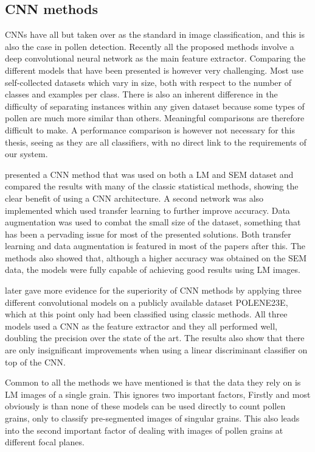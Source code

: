 \subsection{CNN methods}
CNNs have all but taken over as the standard in image classification, and this is also the case in pollen detection.
Recently all the proposed methods involve a deep convolutional neural network as the main feature extractor.
Comparing the different models that have been presented is however very challenging.
Most use self-collected datasets which vary in size, both with respect to the number of classes and examples per class.
There is also an inherent difference in the difficulty of separating instances within any given dataset because some types of pollen are much more similar than others.
Meaningful comparisons are therefore difficult to make.
A performance comparison is however not necessary for this thesis, seeing as they are all classifiers, with no direct link to the requirements of our system.

{\cite{daood_pollen_2016}} presented a CNN method that was used on both a LM and SEM dataset and compared the results with many of the classic statistical methods, showing the clear benefit of using a CNN architecture.
A second network was also implemented which used transfer learning to further improve accuracy.
Data augmentation was used to combat the small size of the dataset, something that has been a pervading issue for most of the presented solutions.
Both transfer learning and data augmentation is featured in most of the papers after this.
The methods also showed that, although a higher accuracy was obtained on the SEM data, the models were fully capable of achieving good results using LM images.

{\cite{sevillano_improving_2018}} later gave more evidence for the superiority of CNN methods by applying three different convolutional models on a publicly available dataset {POLENE23E}, which at this point only had been classified using classic methods.
All three models used a CNN as the feature extractor and they all performed well, doubling the precision over the state of the art.
The results also show that there are only insignificant improvements when using a linear discriminant classifier on top of the CNN\@.

Common to all the methods we have mentioned is that the data they rely on is LM images of a single grain.
This ignores two important factors, Firstly and most obviously is than none of these models can be used directly to count pollen grains, only to classify pre-segmented images of singular grains.
This also leads into the second important factor of dealing with images of pollen grains at different focal planes.

